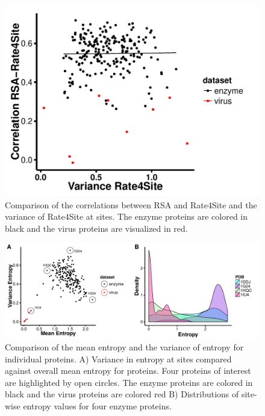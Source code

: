 \documentclass[12pt]{article}
\begin{document}
            \begin{figure}[H]
            \centerline{\includegraphics[width=5.0in]{var_rate_rsa_cor.pdf}}     
            \caption{Comparison of the correlations between RSA and Rate4Site and the variance of Rate4Site at sites. The enzyme proteins are colored in black and the virus proteins are visualized in red.}
            \label{fig:var_rate_rsa_cor}
    \end{figure}
    
 
 
        \begin{figure}[H]
            \centerline{\includegraphics[width=7.5in]{protein_ex_plot.pdf}}     
            \caption{Comparison of the mean entropy and the variance of entropy for individual proteins. A)  Variance in entropy at sites compared against overall mean entropy for proteins. Four proteins of interest are highlighted by open circles. The enzyme proteins are colored in black and the virus proteins are colored red B) Distributions of site-wise entropy values for four enzyme proteins. }
            \label{fig:protein_ex_plot}
    \end{figure}
     
\end{document}
